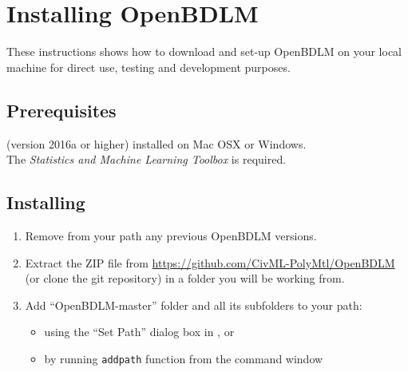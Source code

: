 \section{Installing OpenBDLM}
\label{S:OPENBDLMINSTALLING}

These instructions shows how to download and set-up OpenBDLM on your local machine for direct use, testing and development purposes.
\subsection{Prerequisites}
\MATLAB{} (version 2016a or higher) installed on Mac OSX or Windows.\\

\noindent
The \MATLAB{}  \emph{Statistics and Machine Learning Toolbox} is required.

\subsection{Installing}
\begin{enumerate}
\item Remove from your \MATLAB{} path any previous OpenBDLM versions.
\item Extract the ZIP file from \url{https://github.com/CivML-PolyMtl/OpenBDLM} (or clone the git repository) in a folder you will be working from.
\item Add ``OpenBDLM-master'' folder and all its subfolders to your \MATLAB{}  path:
\begin{itemize}
    \item using the ``Set Path'' dialog box in \MATLAB{}, or 
    \item by running  \lstinline[basicstyle = \mlttfamily \small, backgroundcolor = \color{light-gray}]!addpath! function from the \MATLAB{} command window
    \end{itemize}
\end{enumerate}